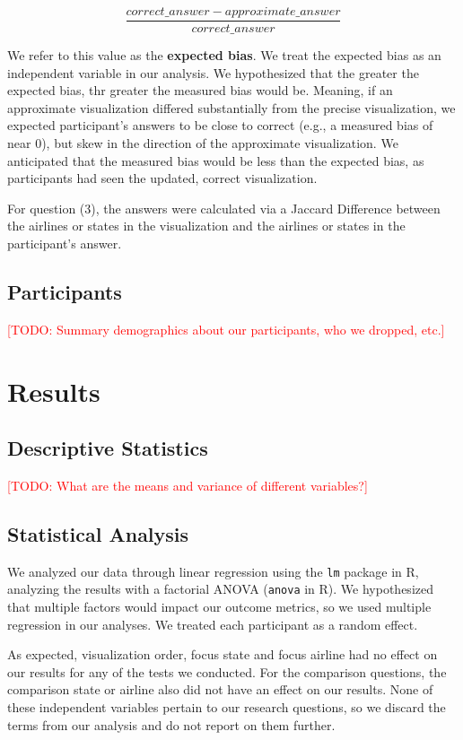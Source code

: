 \documentclass[10pt,journal,compsoc]{IEEEtran}
\newcommand{\note}[2]{\textcolor{#1}{[#2]}}
\newcommand{\todo}[1]{\note{red}{TODO: #1}}
\begin{document}
\[\frac{correct\_answer - approximate\_answer}{correct\_answer}\]

We refer to this value as the \textbf{expected bias}.
We treat the expected bias as an independent variable in our analysis.
We hypothesized that the greater the expected bias, thr greater the measured bias would be.
Meaning, if an approximate visualization differed substantially from the precise visualization, we expected participant's answers to be close to correct (e.g., a measured bias of near 0), but skew in the direction of the approximate visualization.
We anticipated that the measured bias would be less than the expected bias, as participants had seen the updated, correct visualization.

For question (3), the answers were calculated via a Jaccard Difference between the airlines or states in the visualization and the airlines or states in the participant's answer.

\subsection{Participants}

\todo{Summary demographics about our participants, who we dropped, etc.}

\section{Results}\label{sec:results}

\subsection{Descriptive Statistics}

\todo{What are the means and variance of different variables?}

\subsection{Statistical Analysis}

We analyzed our data through linear regression using the \texttt{lm} package in R, analyzing the results with a factorial ANOVA (\texttt{anova} in R).
We hypothesized that multiple factors would impact our outcome metrics, so we used multiple regression in our analyses.
We treated each participant as a random effect.

As expected, visualization order, focus state and focus airline had no effect on our results for any of the tests we conducted.
For the comparison questions, the comparison state or airline also did not have an effect on our results.
None of these independent variables pertain to our research questions, so we discard the terms from our analysis and do not report on them further.
\end{document}
